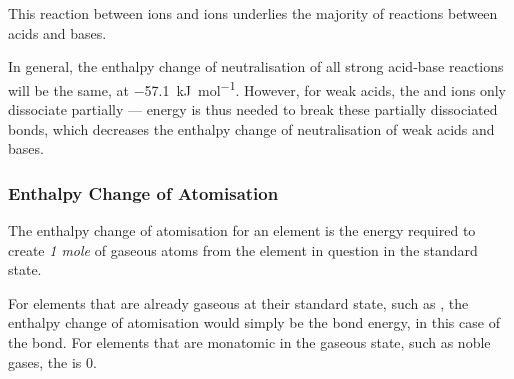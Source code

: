 				\pagebreak
				This reaction between  ions and  ions underlies the majority of reactions between acids and bases.



				In general, the enthalpy change of neutralisation of all strong acid-base reactions will be the same,
				at \SI{-57.1}{\kilo\joule\per\mole}. However, for weak acids, the  and  ions only dissociate
				partially --- energy is thus needed to break these partially dissociated bonds, which decreases the enthalpy change
				of neutralisation of weak acids and bases.





			\subsubsection{Enthalpy Change of Atomisation}

				The enthalpy change of atomisation for an element is the energy required to create \emph{1 mole} of gaseous atoms from the
				element in question in the standard state.


				For elements that are already gaseous at their standard state, such as , the enthalpy change of atomisation would
				simply be the bond energy, in this case of the  bond. For elements that are monatomic in the gaseous state,
				such as noble gases, the  is 0.


